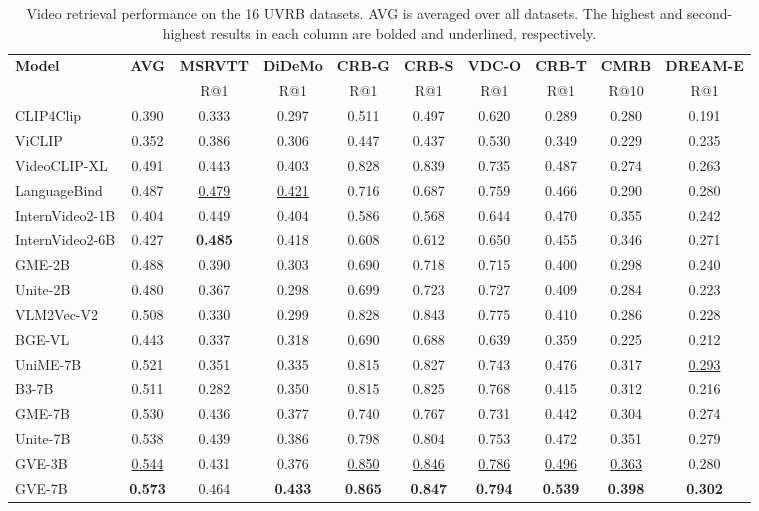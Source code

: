 \begin{table}[t]
\centering
\caption{Video retrieval performance on the 16 UVRB datasets. AVG is averaged over all datasets. The highest and second-highest results in each column are bolded and underlined, respectively.}
\label{gve:tab:main_by_datasets}
\footnotesize
\setlength{\tabcolsep}{2pt}
\begin{tabularx}{\linewidth}{X|>{\columncolor{gray!15}}c|*{8}{c}}
\toprule
\textbf{Model} & \textbf{AVG} & \textbf{MSRVTT} & \textbf{DiDeMo} & \textbf{CRB-G} & \textbf{CRB-S} & \textbf{VDC-O} & \textbf{CRB-T} & \textbf{CMRB} & \textbf{DREAM-E} \\
& & R@1 & R@1 & R@1 & R@1 & R@1 & R@1 & R@10 & R@1 \\
\midrule
CLIP4Clip & 0.390 & 0.333 & 0.297 & 0.511 & 0.497 & 0.620 & 0.289 & 0.280 & 0.191 \\
ViCLIP & 0.352 & 0.386 & 0.306 & 0.447 & 0.437 & 0.530 & 0.349 & 0.229 & 0.235 \\
VideoCLIP-XL & 0.491 & 0.443 & 0.403 & 0.828 & 0.839 & 0.735 & 0.487 & 0.274 & 0.263 \\
LanguageBind & 0.487 & \underline{0.479} & \underline{0.421} & 0.716 & 0.687 & 0.759 & 0.466 & 0.290 & 0.280 \\
InternVideo2-1B & 0.404 & 0.449 & 0.404 & 0.586 & 0.568 & 0.644 & 0.470 & 0.355 & 0.242 \\
InternVideo2-6B & 0.427 & \textbf{0.485} & 0.418 & 0.608 & 0.612 & 0.650 & 0.455 & 0.346 & 0.271 \\
GME-2B & 0.488 & 0.390 & 0.303 & 0.690 & 0.718 & 0.715 & 0.400 & 0.298 & 0.240 \\
Unite-2B & 0.480 & 0.367 & 0.298 & 0.699 & 0.723 & 0.727 & 0.409 & 0.284 & 0.223 \\
VLM2Vec-V2 & 0.508 & 0.330 & 0.299 & 0.828 & 0.843 & 0.775 & 0.410 & 0.286 & 0.228 \\
BGE-VL & 0.443 & 0.337 & 0.318 & 0.690 & 0.688 & 0.639 & 0.359 & 0.225 & 0.212 \\
UniME-7B & 0.521 & 0.351 & 0.335 & 0.815 & 0.827 & 0.743 & 0.476 & 0.317 & \underline{0.293} \\
B3-7B & 0.511 & 0.282 & 0.350 & 0.815 & 0.825 & 0.768 & 0.415 & 0.312 & 0.216 \\
GME-7B & 0.530 & 0.436 & 0.377 & 0.740 & 0.767 & 0.731 & 0.442 & 0.304 & 0.274 \\
Unite-7B & 0.538 & 0.439 & 0.386 & 0.798 & 0.804 & 0.753 & 0.472 & 0.351 & 0.279 \\
\midrule
GVE-3B & \underline{0.544} & 0.431 & 0.376 & \underline{0.850} & \underline{0.846} & \underline{0.786} & \underline{0.496} & \underline{0.363} & 0.280 \\
GVE-7B & \textbf{0.573} & 0.464 & \textbf{0.433} & \textbf{0.865} & \textbf{0.847} & \textbf{0.794} & \textbf{0.539} & \textbf{0.398} & \textbf{0.302} \\
\bottomrule
\end{tabularx}


\end{table}
